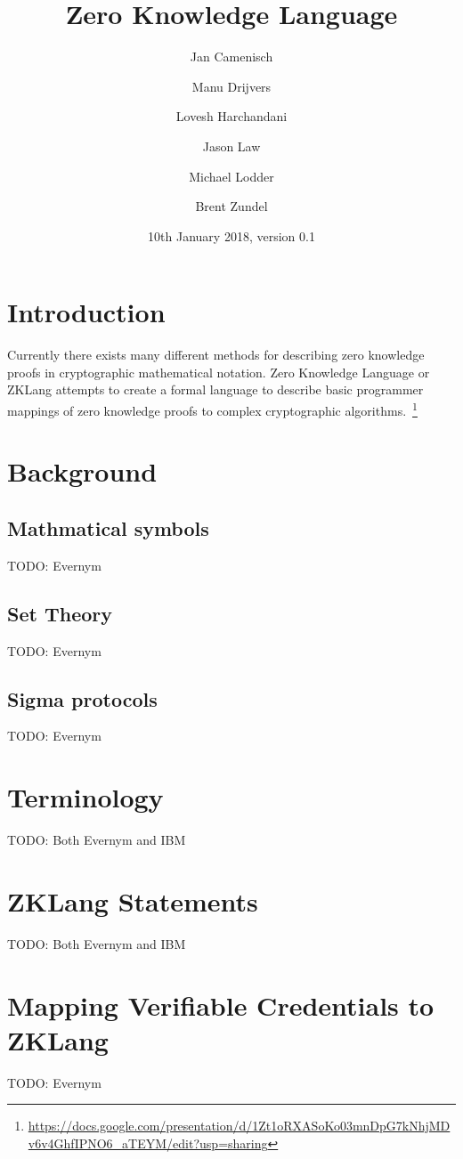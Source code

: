 \documentclass[a4paper]{article}
\title{Zero Knowledge Language}
\author[2]{Jan Camenisch}
\author[2]{Manu Drijvers}
\author[1]{Lovesh Harchandani}
\author[1]{Jason Law}
\author[1]{Michael Lodder}
\author[1]{Brent Zundel}
\affil[1]{Evernym}
\affil[2]{IBM Research -- Zurich}
\date{10th January 2018, version 0.1}
\begin{document}
\maketitle

\section{Introduction}
Currently there exists many different methods for describing zero knowledge proofs in cryptographic mathematical notation. Zero Knowledge Language or ZKLang attempts to create a formal language to describe basic programmer mappings of zero knowledge proofs to complex cryptographic algorithms.~\footnote{\url{https://docs.google.com/presentation/d/1Zt1oRXASoKo03mnDpG7kNhjMDv6v4GhfIPNO6_aTEYM/edit?usp=sharing}}

\section{Background}

\subsection{Mathmatical symbols}
TODO: Evernym

\subsection{Set Theory}
TODO: Evernym

\subsection{Sigma protocols}
TODO: Evernym

\section{Terminology}
TODO: Both Evernym and IBM
%


\section{ZKLang Statements}
TODO: Both Evernym and IBM




\section{Mapping Verifiable Credentials to ZKLang}
TODO: Evernym
\end{document}
